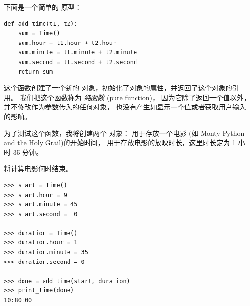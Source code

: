 {下面是一个简单的  原型：

\begin{lstlisting}
def add_time(t1, t2):
    sum = Time()
    sum.hour = t1.hour + t2.hour
    sum.minute = t1.minute + t2.minute
    sum.second = t1.second + t2.second
    return sum
\end{lstlisting}


这个函数创建了一个新的 
对象，初始化了对象的属性，并返回了这个对象的引用。
我们把这个函数称为 {\em 纯函数} (pure function)，
因为它除了返回一个值以外， 并不修改作为参数传入的任何对象，
也没有产生如显示一个值或者获取用户输入的影响。

  




为了测试这个函数，我将创建两个  对象：  用于存放一个电影
(如 Monty Python and the Holy Grail)的开始时间，  用于存放电影的放映时长，这里时长定为 1 小时 35 分钟。

 将计算电影何时结束。


\begin{lstlisting}
>>> start = Time()
>>> start.hour = 9
>>> start.minute = 45
>>> start.second =  0

>>> duration = Time()
>>> duration.hour = 1
>>> duration.minute = 35
>>> duration.second = 0

>>> done = add_time(start, duration)
>>> print_time(done)
10:80:00
\end{lstlisting}


}
